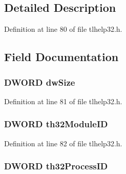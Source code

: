 \subsection{Detailed Description}


Definition at line 80 of file tlhelp32.\+h.



\subsection{Field Documentation}
\subsubsection[{\texorpdfstring{dw\+Size}{dwSize}}]{\setlength{\rightskip}{0pt plus 5cm}D\+W\+O\+RD dw\+Size}\hypertarget{structtag_m_o_d_u_l_e_e_n_t_r_y32_w_a669c5a85f5a9eb97e64ad880fadaaa2d}{}\label{structtag_m_o_d_u_l_e_e_n_t_r_y32_w_a669c5a85f5a9eb97e64ad880fadaaa2d}


Definition at line 81 of file tlhelp32.\+h.

\subsubsection[{\texorpdfstring{th32\+Module\+ID}{th32ModuleID}}]{\setlength{\rightskip}{0pt plus 5cm}D\+W\+O\+RD th32\+Module\+ID}\hypertarget{structtag_m_o_d_u_l_e_e_n_t_r_y32_w_ac028c0e590bc5c6303111ccf82c25517}{}\label{structtag_m_o_d_u_l_e_e_n_t_r_y32_w_ac028c0e590bc5c6303111ccf82c25517}


Definition at line 82 of file tlhelp32.\+h.

\subsubsection[{\texorpdfstring{th32\+Process\+ID}{th32ProcessID}}]{\setlength{\rightskip}{0pt plus 5cm}D\+W\+O\+RD th32\+Process\+ID}\hypertarget{structtag_m_o_d_u_l_e_e_n_t_r_y32_w_a4e94a85eb6671f7346bc1fb284f56186}{}\label{structtag_m_o_d_u_l_e_e_n_t_r_y32_w_a4e94a85eb6671f7346bc1fb284f56186}


